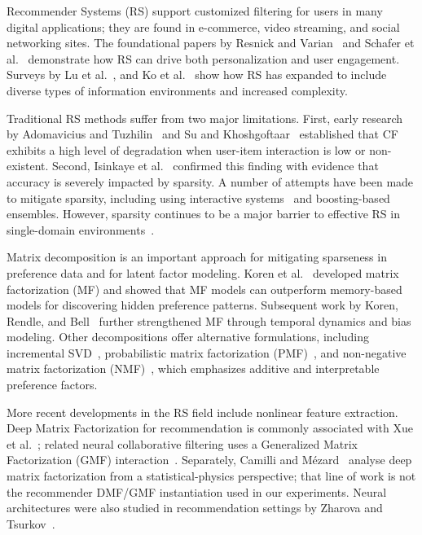 \documentclass[pdflatex,sn-mathphys-num]{sn-jnl}%
\theoremstyle{thmstyleone}%
\theoremstyle{thmstyletwo}%
\theoremstyle{thmstylethree}%
\begin{document}
Recommender Systems (RS) support customized filtering for users in many digital applications; they are found in e-commerce, video streaming, and social networking sites. The foundational papers by Resnick and Varian~\cite{resnick1997recommender} and Schafer et al.~\cite{schafer1999recommender} demonstrate how RS can drive both personalization and user engagement. Surveys by Lu et al.~\cite{lu2015recommender}, and Ko et al.~\cite{ko2022survey} show how RS has expanded to include diverse types of information environments and increased complexity.

Traditional RS methods suffer from two major limitations. First, early research by Adomavicius and Tuzhilin~\cite{adomavicius2005toward} and Su and Khoshgoftaar~\cite{su2009survey} established that CF exhibits a high level of degradation when user-item interaction is low or non-existent. Second, Isinkaye et al.~\cite{isinkaye2015recommendation} confirmed this finding with evidence that accuracy is severely impacted by sparsity. A number of attempts have been made to mitigate sparsity, including using interactive systems~\cite{he2016interactive} and boosting-based ensembles. However, sparsity continues to be a major barrier to effective RS in single-domain environments~\cite{zharova2024application}.

Matrix decomposition is an important approach for mitigating sparseness in preference data and for latent factor modeling. Koren et al.~\cite{koren2009matrix} developed matrix factorization (MF) and showed that MF models can outperform memory-based models for discovering hidden preference patterns. Subsequent work by Koren, Rendle, and Bell~\cite{koren2021advances} further strengthened MF through temporal dynamics and bias modeling. Other decompositions offer alternative formulations, including incremental SVD~\cite{sarwar2002incremental}, probabilistic matrix factorization (PMF)~\cite{mnih2007probabilistic}, and non-negative matrix factorization (NMF)~\cite{lee2000algorithms}, which emphasizes additive and interpretable preference factors.

More recent developments in the RS field include nonlinear feature extraction. Deep Matrix Factorization for recommendation is commonly associated with Xue et al.~\cite{xue2017deep}; related neural collaborative filtering uses a Generalized Matrix Factorization (GMF) interaction~\cite{he2017neural}. Separately, Camilli and M\'ezard~\cite{camilli2023matrix} analyse deep matrix factorization from a statistical-physics perspective; that line of work is not the recommender DMF/GMF instantiation used in our experiments. Neural architectures were also studied in recommendation settings by Zharova and Tsurkov~\cite{zharova2023neural}.
\end{document}
